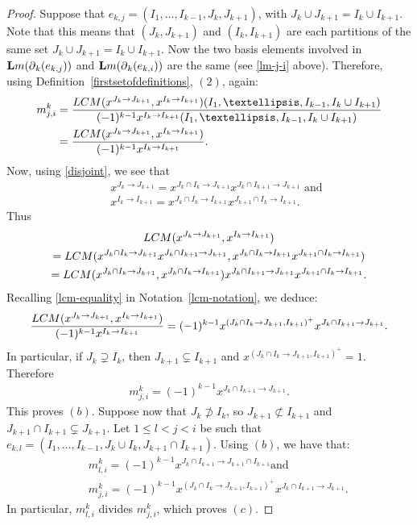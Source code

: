 \documentclass[10pt]{amsart}
\newcommand{\lm}{\mbox{${\bf L}{\rm m}$}}
\newcommand{\dif}{\mbox{$\partial$}}
\newcommand{\Lcm}{\mbox{${\rm LCM}$}}
\theoremstyle{definition}
\theoremstyle{remark}
\begin{document}
\begin{proof}
Suppose that $e_{k,j}=(I_1,\ldots ,I_{k-1},J_{k},J_{k+1})$, with
$J_k\cup J_{k+1}=I_{k}\cup I_{k+1}$. Note that this means that
$(J_k,J_{k+1})$ and $(I_k,I_{k+1})$ are each partitions of the same
set $J_k\cup J_{k+1}=I_{k}\cup I_{k+1}$. Now the two basis elements
involved in $\lm(\dif_{k}(e_{k,j}))$ and $\lm(\dif_k(e_{k,i}))$ are
the same (see \eqref{lm-j-i} above). Therefore, using
Definition~\ref{firstsetofdefinitions}, $(2)$, again:
\begin{align*}
m^k_{j,i} &= \frac{\Lcm(x^{J_k\to J_{k+1}},x^{I_k\to
      I_{k+1}})(I_1,\ldots ,I_{k-1},I_{k}\cup
    I_{k+1})}{(-1)^{k-1}x^{I_k\to I_{k+1}}(I_1,\ldots
    ,I_{k-1},I_{k}\cup I_{k+1})}
 \\ &= \frac{\Lcm(x^{J_k\to
      J_{k+1}},x^{I_k\to I_{k+1}})}{(-1)^{k-1}x^{I_k\to I_{k+1}}}.
\end{align*}
Now, using \eqref{disjoint}, we see that
\begin{eqnarray*}
&&x^{J_k\to J_{k+1}}=x^{J_k\cap I_{k}\to J_{k+1}}x^{J_{k}\cap I_{k+1}\to
  J_{k+1}}\mbox{ and }\\&&x^{I_k\to I_{k+1}}=x^{J_k\cap I_k\to
  I_{k+1}}x^{J_{k+1}\cap I_k\to I_{k+1}}.
\end{eqnarray*}
Thus
\begin{multline*}
\Lcm(x^{J_k\to J_{k+1}},x^{I_k\to I_{k+1}}) \\
=\Lcm(x^{J_k\cap I_{k}\to J_{k+1}}x^{J_{k}\cap I_{k+1}\to J_{k+1}},x^{J_k\cap
I_k\to I_{k+1}}x^{J_{k+1}\cap I_k\to I_{k+1}})\\
= \Lcm(x^{J_k\cap I_{k}\to J_{k+1}},x^{J_k\cap I_k\to I_{k+1}})
  x^{J_{k}\cap I_{k+1}\to J_{k+1}}x^{J_{k+1}\cap I_k\to I_{k+1}}.
\end{multline*}
Recalling \eqref{lcm-equality} in Notation~\ref{lcm-notation}, we
deduce:
\begin{eqnarray*}
\frac{\Lcm(x^{J_k\to J_{k+1}},x^{I_k\to I_{k+1}})}{(-1)^{k-1}x^{I_k\to
    I_{k+1}}}= (-1)^{k-1}x^{(J_k\cap I_k\to J_{k+1},I_{k+1})^+}
x^{J_k\cap I_{k+1}\to J_{k+1}}.
\end{eqnarray*}
In particular, if $J_k\supsetneq I_k$, then $J_{k+1}\subsetneq
I_{k+1}$ and $x^{(J_k\cap I_k\to J_{k+1},I_{k+1})^+}=1$. Therefore
\begin{eqnarray*}
m^k_{j,i}=(-1)^{k-1}x^{J_k\cap I_{k+1}\to J_{k+1}}.
\end{eqnarray*}
This proves $(b)$. Suppose now that $J_k\not\supset I_k$, so
$J_{k+1}\not\subset I_{k+1}$ and $J_{k+1}\cap I_{k+1}\subsetneq
J_{k+1}$. Let $1\leq l<j<i$ be such that $e_{k,l}=(I_1,\ldots
,I_{k-1},J_k\cup I_k,J_{k+1}\cap I_{k+1})$. Using $(b)$, we have that:
\begin{eqnarray*}
&& m^k_{l,i}=(-1)^{k-1}x^{J_k\cap I_{k+1}\to J_{k+1}\cap I_{k+1}}\mbox{
  and }\\ && m^k_{j,i}=(-1)^{k-1}x^{(J_k\cap I_k\to J_{k+1},I_{k+1})^+}
x^{J_k\cap I_{k+1}\to J_{k+1}}.
\end{eqnarray*}
In particular, $m^k_{l,i}$ divides $m^k_{j,i}$, which proves $(c)$.
\end{proof}
\end{document}

